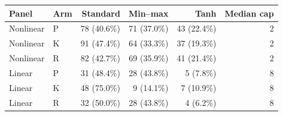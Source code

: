 \begin{tabular}{@{}llrrrr@{}}
\toprule
Panel & Arm & Standard & Min--max & Tanh & Median cap \\
\midrule
Nonlinear & P & 78 (40.6\%) & 71 (37.0\%) & 43 (22.4\%) & 2 \\
Nonlinear & K & 91 (47.4\%) & 64 (33.3\%) & 37 (19.3\%) & 2 \\
Nonlinear & R & 82 (42.7\%) & 69 (35.9\%) & 41 (21.4\%) & 2 \\
Linear & P & 31 (48.4\%) & 28 (43.8\%) & 5 (7.8\%) & 8 \\
Linear & K & 48 (75.0\%) & 9 (14.1\%) & 7 (10.9\%) & 8 \\
Linear & R & 32 (50.0\%) & 28 (43.8\%) & 4 (6.2\%) & 8 \\
\bottomrule
\end{tabular}
